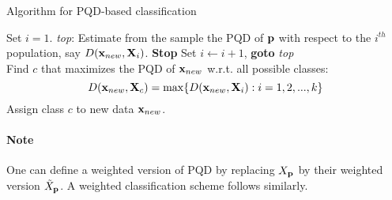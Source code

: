 \documentclass{article}
\begin{document}
\begin{algorithm}[h]
\caption{Algorithm for PQD-based classification}
\begin{algorithmic}[1]
\State Set $i=1$.
\State \emph{top}:
\State Estimate from the sample the PQD of ${\bf{p}}$ with respect to the $i^{th}$ population, say $D({\bf{x}}_{new},{\mathbf{X}}_i)$.
 \textbf{Stop}
	\Else \State Set $i\leftarrow i+1$, \textbf{goto} \emph{top}
\EndIf
\\
\State Find $c$ that maximizes the PQD of ${\bf{x}}_{new}$ w.r.t. all possible classes:
$$ D({\bf{x}}_{new},{\mathbf{X}}_c) = \max\{D({\bf{x}}_{new},{\mathbf{X}}_i): i=1,2,...,k\} $$
\State Assign class $c$ to new data ${\bf{x}}_{new}$.

\EndProcedure
\end{algorithmic}
\end{algorithm}

\paragraph{Note} One can define a weighted version of PQD by replacing $X_{\bf{p}}$ by their weighted version $\tilde X_{\bf{p}}$. A weighted classification scheme follows similarly.
\end{document}

